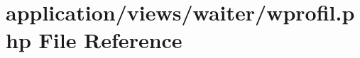 \hypertarget{wprofil_8php}{}\section{application/views/waiter/wprofil.php File Reference}
\label{wprofil_8php}
